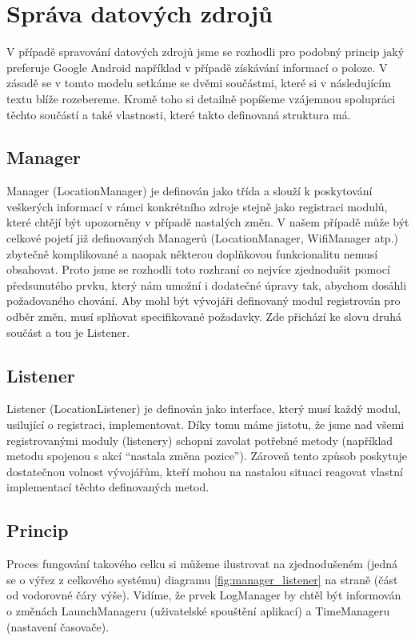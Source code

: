 \documentclass[thesis=M,czech]{FITthesis}[2012/06/26]
\begin{document}
\section{Správa datových zdrojů}\label{data_sources_management}
V případě spravování datových zdrojů jsme se rozhodli pro podobný princip jaký preferuje Google Android například v případě získávání informací o poloze\cite{android_location}. V zásadě se v tomto modelu setkáme se dvěmi součástmi, které si v následujícím textu blíže rozebereme. Kromě toho si detailně popíšeme vzájemnou spolupráci těchto součástí a také vlastnosti, které takto definovaná struktura má.

\subsection{Manager}
Manager (LocationManager\cite{android_location_manager}) je definován jako třída\cite{class} a slouží k poskytování veškerých informací v rámci konkrétního zdroje stejně jako registraci modulů, které chtějí být upozorněny v případě nastalých změn. V našem případě může být celkové pojetí již definovaných Managerů (LocationManager, WifiManager atp.) zbytečně komplikované a naopak některou doplňkovou funkcionalitu nemusí obsahovat. Proto jsme se rozhodli toto rozhraní co nejvíce zjednodušit pomocí předsunutého prvku, který nám umožní i dodatečné úpravy tak, abychom dosáhli požadovaného chování. Aby mohl být vývojáři definovaný modul registrován pro odběr změn, musí splňovat specifikované požadavky. Zde přichází ke slovu druhá součást a tou je Listener.

\subsection{Listener}
Listener (LocationListener\cite{android_location_listener}) je definován jako interface\cite{interface}, který musí každý modul, usilující o registraci, implementovat. Díky tomu máme jistotu, že jsme nad všemi registrovanými moduly (listenery) schopni zavolat potřebné metody (například metodu spojenou s akcí “nastala změna pozice”). Zároveň tento způsob poskytuje dostatečnou volnost vývojářům, kteří mohou na nastalou situaci reagovat vlastní implementací těchto definovaných metod.

\subsection{Princip}
Proces fungování takového celku si můžeme ilustrovat na zjednodušeném (jedná se o výřez z celkového systému) diagramu \ref{fig:manager_listener} na straně \pageref{fig:manager_listener} (část od vodorovné čáry výše). Vidíme, že prvek LogManager by chtěl být informován o změnách LaunchManageru (uživatelské spouštění aplikací) a TimeManageru (nastavení časovače).
\end{document}
